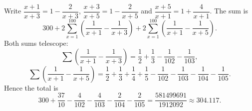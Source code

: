 Write $\dfrac{x+1}{x+3}=1-\dfrac2{x+3}$, $\dfrac{x+3}{x+5}=1-\dfrac2{x+5}$ and $\dfrac{x+5}{x+1}=1+\dfrac4{x+1}$. The sum is
\[300+2\sum_{x=1}^{100}\left(\dfrac1{x+1}-\dfrac1{x+3}\right)+2\sum_{x=1}^{100}\left(\dfrac1{x+1}-\dfrac1{x+5}\right).\]
Both sums telescope:
\[\sum\left(\dfrac1{x+1}-\dfrac1{x+3}\right)=\dfrac12+\dfrac13-\dfrac1{102}-\dfrac1{103},\]
\[\sum\left(\dfrac1{x+1}-\dfrac1{x+5}\right)=\dfrac12+\dfrac13+\dfrac14+\dfrac15-\dfrac1{102}-\dfrac1{103}-\dfrac1{104}-\dfrac1{105}.\]
Hence the total is
\[300+\dfrac{37}{10}-\dfrac4{102}-\dfrac4{103}-\dfrac2{104}-\dfrac2{105}=\boxed{\dfrac{581499691}{1912092}}\approx304.117.\]
